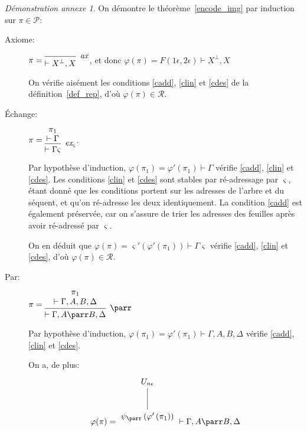 \documentclass[11pt,a4paper]{article}
\theoremstyle{plain}
\theoremstyle{definition}
\theoremstyle{remark}
\newtheorem{demonstrationappendix}{Démonstration annexe}
\newcommand*{\orth}{^\perp}
\newcommand*{\namedproofv}[2]{\hypo{#1}\infer[no rule]{1}{\vdash #2}}
\newcommand*{\axv}[1]{\infer{0}[\ensuremath{\mathit{ax}}]{\vdash #1}}
\newcommand*{\parrv}[1]{\infer{1}[\ensuremath{\parr}]{\vdash #1}}
\newcommand*{\permv}[2]{\infer{1}[\ensuremath{\textit{ex}_{#1}}]{\vdash #2}}
\newcommand*{\permapp}[2]{#2 #1}
\newcommand*{\someperm}{\varsigma}
\newcommand*{\someproof}{\pi}
\newcommand*{\sequent}{\Gamma}
\newcommand*{\sequentbis}{\Delta}
\newcommand*{\proofs}{\ensuremath{\mathcal{P}}}
\newcommand*{\representations}{\ensuremath{\mathcal{R}}}
\newcommand*{\encode}{\ensuremath{\varphi}}
\begin{document}
\begin{demonstrationappendix}
    \label{proof_img_encode}
    On démontre le théorème~\ref{encode_img} par induction sur $\someproof \in \proofs$:
    \begin{description}
    \item[Axiome:] $\someproof =
    \begin{prooftree}
        \axv{X\orth, X}
    \end{prooftree}$,
    et donc $\encode \left( \someproof \right) = F(1 \epsilon, 2 \epsilon) \vdash X\orth, X$

    On vérifie aisément les conditions \ref{cadd}, \ref{clin} et \ref{cdes} de la définition~\ref{def_rep}, d'où $\encode \left( \someproof \right) \in \representations$.

    \item[Échange:] $\someproof =
    \begin{prooftree}
        \namedproofv{\pi_1}{\sequent}
        \permv{\someperm}{\permapp{\someperm}{\sequent}}
    \end{prooftree}$.
    
    Par hypothèse d'induction, $\encode \left( \pi_1 \right) = \encode ' \left( \pi_1 \right) \vdash \sequent$ vérifie \ref{cadd}, \ref{clin} et \ref{cdes}. Les conditions \ref{clin} et \ref{cdes} sont stables par ré-adressage par $\someperm$, étant donné que les conditions portent sur les adresses de l'arbre et du séquent, et qu'on ré-adresse les deux identiquement. La condition \ref{cadd} est également préservée, car on s'assure de trier les adresses des feuilles après avoir ré-adressé par $\someperm$.

    On en déduit que $\encode \left( \someproof \right) = \someperm' \left( \encode ' \left( \pi_1 \right) \right) \vdash \permapp{\someperm}{\sequent}$ vérifie \ref{cadd}, \ref{clin} et \ref{cdes}, d'où $\encode \left( \someproof \right) \in \representations$.

    \item[Par:] $\someproof =
    \begin{prooftree}
      \namedproofv{\pi_1}{\sequent, A, B, \sequentbis}
      \parrv{\sequent, A \parr B, \sequentbis}
    \end{prooftree}$

    Par hypothèse d'induction, $\encode \left( \pi_1 \right) = \encode ' \left( \pi_1 \right) \vdash \sequent, A, B, \sequentbis$ vérifie \ref{cadd}, \ref{clin} et \ref{cdes}.
    
    On a, de plus:
    \begin{equation*}
    \encode ( \someproof ) = \begin{tikzpicture}%
    [level 2/.style={sibling distance=3.5cm}]
    \node {$U_{n \epsilon}$}
        child {node {$\psi_\parr \left( \encode' \left( \pi_1 \right) \right)$}
    };
    \end{tikzpicture} \vdash \sequent, A \parr B, \sequentbis
    \end{equation*}


\end{description}
\end{demonstrationappendix}
\end{document}
